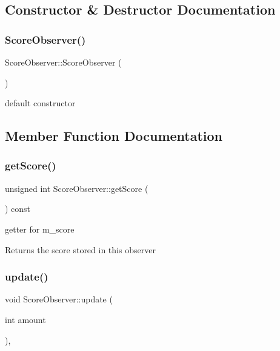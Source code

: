 \subsection{Constructor \& Destructor Documentation}
\mbox{\label{classScoreObserver_a29bf728993aedfded2ecf7c16df701cf}} 
\subsubsection{\texorpdfstring{Score\+Observer()}{ScoreObserver()}}
{\footnotesize\ttfamily Score\+Observer\+::\+Score\+Observer (\begin{DoxyParamCaption}{ }\end{DoxyParamCaption})}

default constructor 

\subsection{Member Function Documentation}
\mbox{\label{classScoreObserver_a99e163d5b7a3b53cdd9ae808a253235e}} 
\subsubsection{\texorpdfstring{get\+Score()}{getScore()}}
{\footnotesize\ttfamily unsigned int Score\+Observer\+::get\+Score (\begin{DoxyParamCaption}{ }\end{DoxyParamCaption}) const}

getter for m\+\_\+score \begin{DoxyReturn}{Returns}
the score stored in this observer 
\end{DoxyReturn}
\mbox{\label{classScoreObserver_ad1b2727dbdc1f47de4b118a22fbdc12e}} 
\subsubsection{\texorpdfstring{update()}{update()}}
{\footnotesize\ttfamily void Score\+Observer\+::update (\begin{DoxyParamCaption}\item[{int}]{amount }\end{DoxyParamCaption})\hspace{0.3cm}{\ttfamily [override]}, {\ttfamily [virtual]}}

